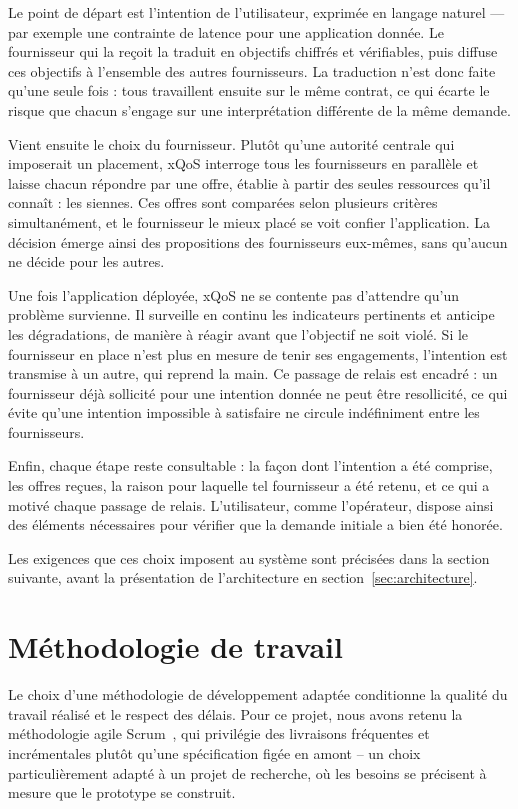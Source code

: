 Le point de départ est l'intention de l'utilisateur, exprimée en langage naturel — par exemple une contrainte de latence pour une application donnée. Le fournisseur qui la reçoit la traduit en objectifs chiffrés et vérifiables, puis diffuse ces objectifs à l'ensemble des autres fournisseurs. La traduction n'est donc faite qu'une seule fois : tous travaillent ensuite sur le même contrat, ce qui écarte le risque que chacun s'engage sur une interprétation différente de la même demande.

Vient ensuite le choix du fournisseur. Plutôt qu'une autorité centrale qui imposerait un placement, xQoS interroge tous les fournisseurs en parallèle et laisse chacun répondre par une offre, établie à partir des seules ressources qu'il connaît : les siennes. Ces offres sont comparées selon plusieurs critères simultanément, et le fournisseur le mieux placé se voit confier l'application. La décision émerge ainsi des propositions des fournisseurs eux-mêmes, sans qu'aucun ne décide pour les autres.

Une fois l'application déployée, xQoS ne se contente pas d'attendre qu'un problème survienne. Il surveille en continu les indicateurs pertinents et anticipe les dégradations, de manière à réagir avant que l'objectif ne soit violé. Si le fournisseur en place n'est plus en mesure de tenir ses engagements, l'intention est transmise à un autre, qui reprend la main. Ce passage de relais est encadré : un fournisseur déjà sollicité pour une intention donnée ne peut être resollicité, ce qui évite qu'une intention impossible à satisfaire ne circule indéfiniment entre les fournisseurs.

Enfin, chaque étape reste consultable : la façon dont l'intention a été comprise, les offres reçues, la raison pour laquelle tel fournisseur a été retenu, et ce qui a motivé chaque passage de relais. L'utilisateur, comme l'opérateur, dispose ainsi des éléments nécessaires pour vérifier que la demande initiale a bien été honorée.

Les exigences que ces choix imposent au système sont précisées dans la section suivante, avant la présentation de l'architecture en section~\ref{sec:architecture}.
\section{Méthodologie de travail}
\label{sec:methodologie}

Le choix d'une méthodologie de développement adaptée conditionne la qualité du travail réalisé et le respect des délais. Pour ce projet, nous avons retenu la méthodologie agile Scrum~\cite{schwaber2020scrumguide}, qui privilégie des livraisons fréquentes et incrémentales plutôt qu'une spécification figée en amont -- un choix particulièrement adapté à un projet de recherche, où les besoins se précisent à mesure que le prototype se construit.

